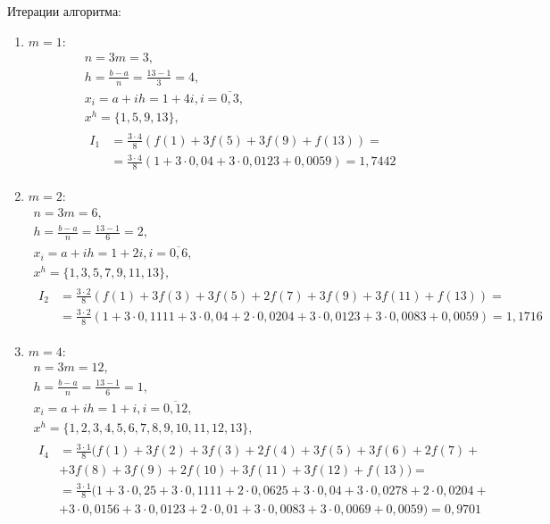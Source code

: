 \documentclass[a4paper, 12pt]{article}
\begin{document}
	Итерации алгоритма:
	\begin{enumerate}
		\item $m=1$:
		\begin{equation*}
			\begin{gathered}
				n=3m=3,\\
				h=\frac{b-a}{n}=\frac{13-1}{3}=4,\\
				x_i=a+ih=1+4i, i=\overline{0,3},\\
				x^h=\{1,5,9,13\},\\
				\begin{aligned}
					I_1&=\frac{3\cdot4}{8}(f(1)+3f(5)+3f(9)+f(13))=\\&=\frac{3\cdot4}{8}(1+3\cdot0,04+3\cdot0,0123+0,0059)=1,7442
				\end{aligned}
			\end{gathered}
		\end{equation*}
		\item $m=2$:
		\begin{equation*}
			\begin{gathered}
				n=3m=6,\\
				h=\frac{b-a}{n}=\frac{13-1}{6}=2,\\
				x_i=a+ih=1+2i, i=\overline{0,6},\\
				x^h=\{1,3,5,7,9,11,13\},\\
				\begin{aligned}
					I_2&=\frac{3\cdot2}{8}(f(1)+3f(3)+3f(5)+2f(7)+3f(9)+3f(11)+f(13))=\\&=\frac{3\cdot2}{8}(1+3\cdot0,1111+3\cdot0,04+2\cdot0,0204+3\cdot0,0123+3\cdot0,0083+0,0059)=1,1716
				\end{aligned}
			\end{gathered}
		\end{equation*}
		\item $m=4$:
		\begin{equation*}
			\begin{gathered}
				n=3m=12,\\
				h=\frac{b-a}{n}=\frac{13-1}{6}=1,\\
				x_i=a+ih=1+i, i=\overline{0,12},\\
				x^h=\{1,2,3,4,5,6,7,8,9,10,11,12,13\},\\
				\begin{aligned}
					I_4&=\frac{3\cdot1}{8}(f(1)+3f(2)+3f(3)+2f(4)+3f(5)+3f(6)+2f(7)+\\&+3f(8)+3f(9)+2f(10)+3f(11)+3f(12)+f(13))=\\&=\frac{3\cdot1}{8}(1+3\cdot0,25+3\cdot0,1111+2\cdot0,0625+3\cdot0,04+3\cdot0,0278+2\cdot0,0204+\\&+3\cdot0,0156+3\cdot0,0123+2\cdot0,01+3\cdot0,0083+3\cdot0,0069+0,0059)=0,9701
				\end{aligned}
			\end{gathered}
	\end{equation*}
	\end{enumerate}
	
\end{document}
